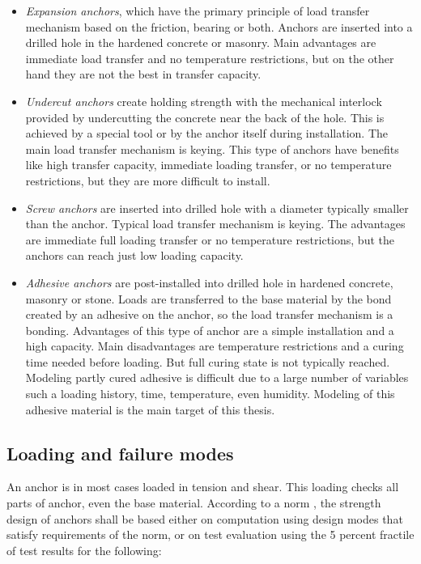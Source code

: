 	\begin{itemize}

	\item \textit{Expansion anchors}, which have the primary principle of load transfer mechanism based on the friction, bearing or both. Anchors are inserted into a drilled hole in the hardened concrete or masonry. Main advantages are immediate load transfer and no temperature restrictions, but on the other hand they are not the best in transfer capacity. 

	\item \textit{Undercut anchors} create holding strength with the mechanical interlock provided by undercutting the concrete near the back of the hole. This is achieved by a special tool or by the anchor itself during installation. The main load transfer mechanism is keying. This type of anchors have benefits like high transfer capacity, immediate loading transfer, or no temperature restrictions, but they are more difficult to install. 

	\item \textit{Screw anchors} are inserted into drilled hole with a diameter typically smaller than the anchor. Typical load transfer mechanism is keying. The advantages are immediate full loading transfer or no temperature restrictions, but the anchors can reach just low loading capacity.

	\item \textit{Adhesive anchors} are post-installed into drilled hole in hardened concrete, masonry or stone. Loads are transferred to the base material by the bond created by an adhesive on the anchor, so the load transfer mechanism is a bonding. Advantages of this type of anchor are a simple installation and a high capacity. Main disadvantages are temperature restrictions and a curing time needed before loading. But full curing state is not typically reached. Modeling partly cured adhesive is difficult due to a large number of variables such a loading history, time, temperature, even humidity. Modeling of this adhesive material is the main target of this thesis.
\end{itemize} 

\subsection{Loading and failure modes}
An anchor is in most cases loaded in tension and shear. This loading checks all parts of anchor, even the base material. According to a norm \cite{anchors-ACI-318M}, the strength design of anchors shall be based either on computation using design modes that satisfy requirements of the norm, or on test evaluation using the 5 percent fractile of test results for the following:

